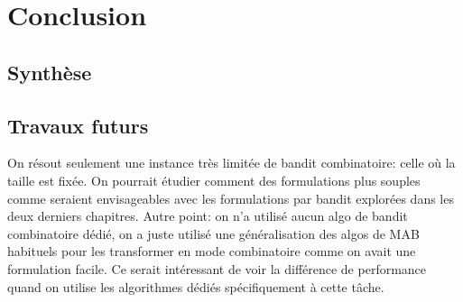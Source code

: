 \chapter*{Conclusion}           %
\label{chap:conclusion}         %

\section*{Synthèse}


\section*{Travaux futurs}

On résout seulement une instance très limitée de bandit combinatoire: celle où la taille est
fixée.
On pourrait étudier comment des formulations plus souples comme \citep{luo-etal-2019-reading}
seraient envisageables avec les formulations par bandit explorées dans les deux derniers chapitres.
Autre point: on n'a utilisé aucun algo de bandit combinatoire dédié, on a juste utilisé
une généralisation des algos de MAB habituels pour les transformer en mode combinatoire
comme on avait une formulation facile.
Ce serait intéressant de voir la différence de performance quand on utilise les algorithmes
dédiés spécifiquement à cette tâche.
